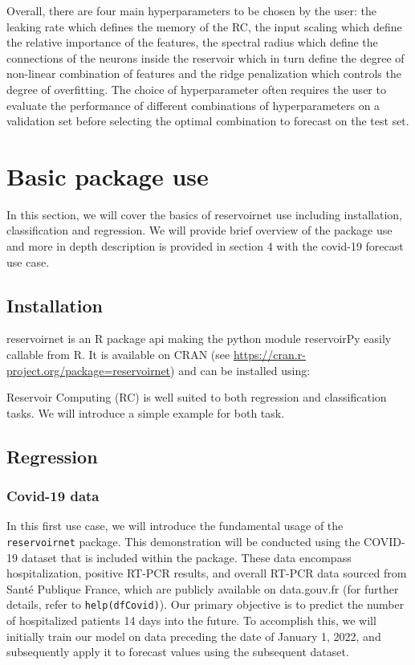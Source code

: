 \documentclass[
  11pt,
  a4paper,
]{article}
\theoremstyle{plain}
\theoremstyle{remark}
\begin{document}
Overall, there are four main hyperparameters to be chosen by the user:
the leaking rate which defines the memory of the RC, the input scaling
which define the relative importance of the features, the spectral
radius which define the connections of the neurons inside the reservoir
which in turn define the degree of non-linear combination of features
and the ridge penalization which controls the degree of overfitting. The
choice of hyperparameter often requires the user to evaluate the
performance of different combinations of hyperparameters on a validation
set before selecting the optimal combination to forecast on the test
set.

\section{Basic package use}\label{basic-package-use}

In this section, we will cover the basics of reservoirnet use including
installation, classification and regression. We will provide brief
overview of the package use and more in depth description is provided in
section 4 with the covid-19 forecast use case.

\subsection{Installation}\label{installation}

reservoirnet is an R package api making the python module reservoirPy
easily callable from R. It is available on CRAN (see
\url{https://cran.r-project.org/package=reservoirnet}) and can be
installed using:

Reservoir Computing (RC) is well suited to both regression and
classification tasks. We will introduce a simple example for both task.

\subsection{Regression}\label{basicregression}

\subsubsection{Covid-19 data}\label{covid-19-data}

In this first use case, we will introduce the fundamental usage of the
\texttt{reservoirnet} package. This demonstration will be conducted
using the COVID-19 dataset that is included within the package. These
data encompass hospitalization, positive RT-PCR results, and overall
RT-PCR data sourced from Santé Publique France, which are publicly
available on data.gouv.fr (for further details, refer to
\texttt{help(dfCovid)}). Our primary objective is to predict the number
of hospitalized patients 14 days into the future. To accomplish this, we
will initially train our model on data preceding the date of January 1,
2022, and subsequently apply it to forecast values using the subsequent
dataset.
\end{document}
